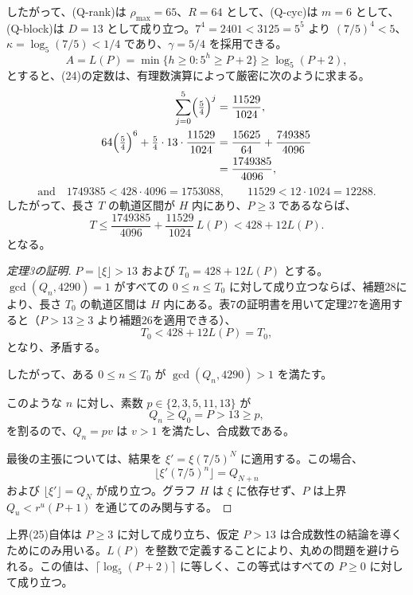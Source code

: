 \documentclass[11pt,reqno]{amsart}
\theoremstyle{definition}
\theoremstyle{definition}
\theoremstyle{remark}
\begin{document}
したがって、(Q-rank)は \(\rho_{\max}=65\)、\(R=64\) として、(Q-cyc)は \(m=6\) として、(Q-block)は \(D=13\) として成り立つ。\(7^4=2401<3125=5^5\) より \((7/5)^4<5\)、\(\kappa=\log_5(7/5)<1/4\) であり、\(\gamma=5/4\) を採用できる。
\[
A=L(P)=\min\{h\ge0:5^h\ge P+2\}\ge\log_5(P+2),
\]
とすると、(24)の定数は、有理数演算によって厳密に次のように求まる。
\[
\begin{aligned}
\sum_{j=0}^{5}\Bigl(\tfrac54\Bigr)^j&=\frac{11529}{1024},\\
64\Bigl(\tfrac54\Bigr)^6+\tfrac54\cdot13\cdot\frac{11529}{1024}
&=\frac{15625}{64}+\frac{749385}{4096}\\
&=\frac{1749385}{4096},
\end{aligned}
\]
\[
\text{and}\quad
1749385<428\cdot4096=1753088,\qquad 11529<12\cdot1024=12288.
\]
したがって、長さ \(T\) の軌道区間が \(H\) 内にあり、\(P\ge3\) であるならば、
\[
T\le\frac{1749385}{4096}+\frac{11529}{1024}\,L(P)<428+12L(P).
\tag{25}\label{eq:25}
\]
となる。

\begin{proof}[定理3の証明]\leavevmode\label{proof:3}
\(P=\lfloor\xi\rfloor>13\) および \(T_0=428+12L(P)\) とする。\(\gcd(Q_n,4290)=1\) がすべての \(0\le n\le T_0\) に対して成り立つならば、補題28により、長さ \(T_0\) の軌道区間は \(H\) 内にある。表7の証明書を用いて定理27を適用すると（\(P>13\ge3\) より補題26を適用できる）、
\[
T_0<428+12L(P)=T_0,
\]
となり、矛盾する。

したがって、ある \(0\le n\le T_0\) が \(\gcd(Q_n,4290)>1\) を満たす。

このような \(n\) に対し、素数 \(p\in\{2,3,5,11,13\}\) が
\[
Q_n\ge Q_0=P>13\ge p,
\]
を割るので、\(Q_n=pv\) は \(v>1\) を満たし、合成数である。

最後の主張については、結果を \(\xi'=\xi(7/5)^N\) に適用する。この場合、
\[
\lfloor\xi'(7/5)^n\rfloor=Q_{N+n}
\]
および \(\lfloor\xi'\rfloor=Q_N\) が成り立つ。グラフ \(H\) は \(\xi\) に依存せず、\(P\) は上界 \(Q_u<r^u(P+1)\) を通じてのみ関与する。\qedhere
\end{proof}

上界(25)自体は \(P\ge3\) に対して成り立ち、仮定 \(P>13\) は合成数性の結論を導くためにのみ用いる。\(L(P)\) を整数で定義することにより、丸めの問題を避けられる。この値は、\(\lceil\log_5(P+2)\rceil\) に等しく、この等式はすべての \(P\ge0\) に対して成り立つ。
\end{document}
